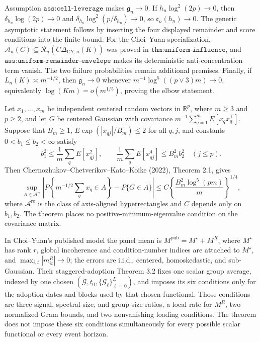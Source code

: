 Assumption \(\texttt{ass:cell-leverage}\) makes \(\mathfrak g_n\to0\).
If \(h_n\log^2(2p)\to0\), then
\(\delta_{h_n}\log(2p)\to0\) and
\(\delta_{h_n}\log^2(p/\delta_{h_n})\to0\), so
\(\mathfrak c_n(h_n)\to0\).  The generic asymptotic statement follows
by inserting the four displayed remainder and score conditions into the
finite bound.  For the Choi--Yuan specialization,
\(\mathcal A_n(C)\subseteq
\mathcal R_n(C\Delta_{\mathrm{CY},n}(K))\) was proved in
\(\texttt{thm:uniform-influence}\), and
\(\texttt{ass:uniform-remainder-envelope}\) makes its deterministic
anti-concentration term vanish.  The two failure probabilities remain
additional premises.  Finally, if \(L_n(K)\asymp m^{-1/2}\), then
\(\mathfrak g_n\to0\) whenever
\(m^{-1}\log^5((p\vee3)m)\to0\), equivalently
\(\log(Km)=o(m^{1/5})\), proving the elbow statement.

Let \(x_1,\ldots,x_m\) be independent centered random vectors in
\(\mathbb R^p\), where \(m\ge3\) and \(p\ge2\), and let
\(G\) be centered Gaussian with covariance
\(m^{-1}\sum_{q=1}^mE[x_qx_q^\top]\).  Suppose that \(B_m\ge1\),
\(E\exp(|x_{qj}|/B_m)\le2\) for all \(q,j\), and constants
\(0<b_1\le b_2<\infty\) satisfy
\[
 b_1^2\le \frac1m\sum_qE[x_{qj}^2],
 \qquad
 \frac1m\sum_qE[x_{qj}^4]\le B_m^2b_2^2
 \quad(j\le p).
\]
Then Chernozhukov--Chetverikov--Kato--Koike (2022), Theorem 2.1, gives
\[
 \sup_{A\in\mathcal A^{\mathrm{re}}}
 \left|P\!\left\{m^{-1/2}\sum_qx_q\in A\right\}-P\{G\in A\}\right|
 \le C\left\{\frac{B_m^2\log^5(pm)}m\right\}^{1/4},
\]
where \(\mathcal A^{\mathrm{re}}\) is the class of axis-aligned
hyperrectangles and \(C\) depends only on \(b_1,b_2\).  The theorem
places no positive-minimum-eigenvalue condition on the covariance matrix.

In Choi--Yuan's published model the panel mean is
\(M^{\mathrm{pub}}=M^\star+M^R\), where \(M^\star\) has rank \(r\), global
incoherence and condition-number indices are attached to \(M^\star\),
and \(\max_{i,t}|m^R_{it}|\to0\); the errors are i.i.d., centered,
homoskedastic, and sub-Gaussian.  Their staggered-adoption Theorem 3.2
fixes one scalar group average, indexed by one chosen
\((\mathcal G,t_0,\{\mathcal G_\ell\}_{\ell=0}^L)\), and imposes its six
conditions only for the adoption dates and blocks used by that chosen
functional.  Those conditions are three signal, spectral-size, and
group-size ratios, a local rate for \(M^R\), two normalized Gram bounds,
and two nonvanishing loading conditions.  The theorem does not impose
these six conditions simultaneously for every possible scalar functional
or every event horizon.

